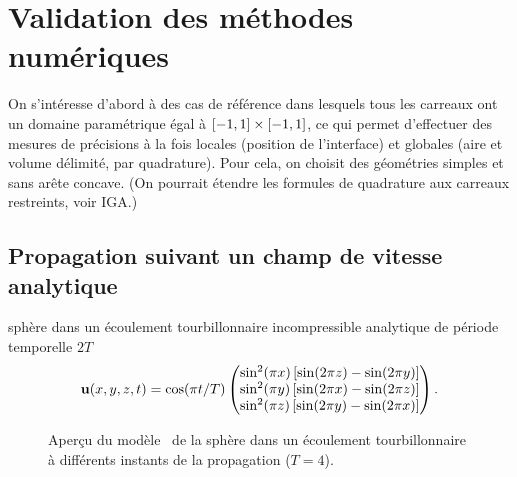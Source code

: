 \chapter{Validation des méthodes numériques}

On s'intéresse d'abord à des cas de référence dans lesquels tous les carreaux ont un domaine paramétrique égal à $\left[ -1, 1 \right] \times \left[ -1, 1 \right]$, ce qui permet d'effectuer des mesures de précisions à la fois locales (position de l'interface) et globales (aire et volume délimité, par quadrature). 
Pour cela, on choisit des géométries simples et sans arête concave.
(On pourrait étendre les formules de quadrature aux carreaux restreints, voir IGA.)

\section{Propagation suivant un champ de vitesse analytique}

sphère dans un écoulement tourbillonnaire incompressible analytique de période temporelle $2T$
\begin{equation}
	\mathbf{u}(x,y,z,t) = 
	\cos( \pi t/T )
	\begin{pmatrix} 
	\sin^2(\pi x) \left[ \sin(2\pi z) - \sin(2\pi y)\right] \\
\sin^2(\pi y) \left[ \sin(2\pi x) - \sin(2\pi z)\right] \\
\sin^2(\pi z) \left[ \sin(2\pi y) - \sin(2\pi x)\right]
	 \end{pmatrix}.
\end{equation}

\begin{figure}
	\centering
	
	\caption{Aperçu du modèle \brep\ de la sphère dans un écoulement tourbillonnaire à différents instants de la propagation ($T=4$).}
	\label{fig:snapshots_vortex}
\end{figure}

